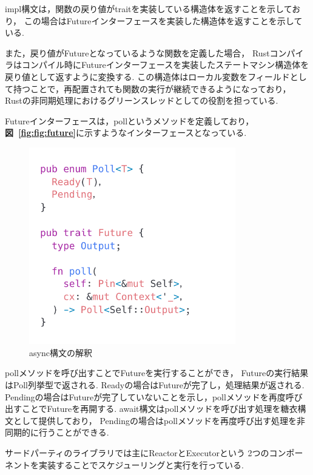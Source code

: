 \documentclass[a4paper,11pt]{jreport}
\newcommand\figref[1]{\textbf{図~\ref{fig:#1}}}
\begin{document}
impl構文は，関数の戻り値がtraitを実装している構造体を返すことを示しており，
この場合はFutureインターフェースを実装した構造体を返すことを示している.

また，戻り値がFutureとなっているような関数を定義した場合，
Rustコンパイラはコンパイル時にFutureインターフェースを実装したステートマシン構造体を戻り値として返すように変換する.
この構造体はローカル変数をフィールドとして持つことで，再配置されても関数の実行が継続できるようになっており，
Rustの非同期処理におけるグリーンスレッドとしての役割を担っている. 

Futureインターフェースは，pollというメソッドを定義しており，
\figref{fig:future}に示すようなインターフェースとなっている.
\begin{figure}[tb]
	\centering
	\includegraphics[width=9cm, bb=0 0 800 550]{figures/future_trait.png}
	\caption{async構文の解釈}
	\label{fig:future}
\end{figure}
pollメソッドを呼び出すことでFutureを実行することができ，
Futureの実行結果はPoll列挙型で返される.
Readyの場合はFutureが完了し，処理結果が返される.
Pendingの場合はFutureが完了していないことを示し，pollメソッドを再度呼び出すことでFutureを再開する.
await構文はpollメソッドを呼び出す処理を糖衣構文として提供しており，
Pendingの場合はpollメソッドを再度呼び出す処理を非同期的に行うことができる.

サードパーティのライブラリでは主にReactorとExecutorという
2つのコンポーネントを実装することでスケジューリングと実行を行っている.
\end{document}
